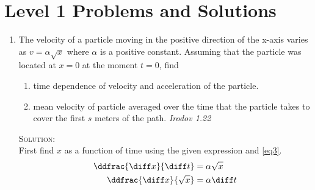 \section{Level 1 Problems and Solutions}

\begin{enumerate}

\item The velocity of a particle moving in the positive direction of the x-axis varies as $v=\alpha\sqrt{x}$ where $\alpha$ is a positive constant. Assuming that the particle was located at $x=0$ at the moment $t=0$, find
\begin{enumerate}
\item time dependence of velocity and acceleration of the particle.
\item mean velocity of particle averaged over the time that the particle takes to cover the first $s$ meters of the path. \hfill \textsl{Irodov 1.22}
\end{enumerate}

\textsc{Solution:}\\
First find $x$ as a function of time using the given expression and \eqref{eq3}.
\begin{align*}
\ddfrac{\diff x}{\diff t}&=\alpha\sqrt{x}\\
\ddfrac{\diff x}{\sqrt{x}}&=\alpha\diff t
\end{align*}


\end{enumerate}
